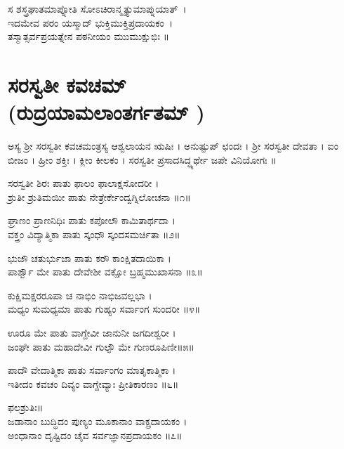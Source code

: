 ಸ ಶಸ್ತ್ರಘಾತಮಾಪ್ನೋತಿ ಸೋಽಚಿರಾನ್ಮೃತ್ಯುಮಾಪ್ನುಯಾತ್~।\\
ಇದಮೇವ ಪರಂ ಯಸ್ಮಾದ್ ಭುಕ್ತಿಮುಕ್ತಿಪ್ರದಾಯಕಂ~।\\
ತಸ್ಮಾತ್ಸರ್ವಪ್ರಯತ್ನೇನ ಪಠನೀಯಂ ಮುುಮುಕ್ಷುಭಿಃ ॥

\section{ಸರಸ್ವತೀ ಕವಚಮ್\\ (ರುದ್ರಯಾಮಲಾಂತರ್ಗತಮ್ )}

ಅಸ್ಯ ಶ್ರೀ ಸರಸ್ವತೀ ಕವಚಮಂತ್ರಸ್ಯ ಆಶ್ವಲಾಯನ ಋಷಿಃ । ಅನುಷ್ಟುಪ್ ಛಂದಃ । ಶ್ರೀ ಸರಸ್ವತೀ ದೇವತಾ । ಐಂ ಬೀಜಂ । ಹ್ರೀಂ ಶಕ್ತಿಃ । ಕ್ಲೀಂ ಕೀಲಕಂ । ಸರಸ್ವತೀ ಪ್ರಸಾದಸಿದ್ಧ್ಯರ್ಥೇ ಜಪೇ ವಿನಿಯೋಗಃ ॥


ಸರಸ್ವತೀ ಶಿರಃ ಪಾತು ಫಾಲಂ ಫಾಲಾಕ್ಷಸೋದರೀ ।\\
ಶ್ರುತೀ ಶ್ರುತಿಮಯೀ ಪಾತು ನೇತ್ರೇರ್ಕೇಂದ್ವಗ್ನಿಲೋಚನಾ ॥೧॥

ಘ್ರಾಣಂ ಪ್ರಾಣನಿಧಿಃ ಪಾತು ಕಪೋಲೌ ಕಾಮಿತಾರ್ಥದಾ ।\\
ವಕ್ತ್ರಂ ವಿದ್ಯಾತ್ಮಿಕಾ ಪಾತು ಸ್ಕಂಧೌ ಸ್ಕಂದಸಮರ್ಚಿತಾ ॥೨॥

ಭುಜೌ ಚತುರ್ಭುಜಾ ಪಾತು ಕರೌ ಕಾಂಕ್ಷಿತದಾಯಿಕಾ ।\\
ಪಾರ್ಶ್ವೌ ಮೇ ಪಾತು ದೇವೇಶೀ ವಕ್ಷೋ ಬ್ರಹ್ಮಮುಖಾಸನಾ ॥೩॥

ಕುಕ್ಷಿಮಕ್ಷರರೂಪಾ ಚ ನಾಭಿಂ ನಾಭಿಜವಲ್ಲಭಾ ।\\
ಮಧ್ಯಂ ಸುಮಧ್ಯಮಾ ಪಾತು ಗುಹ್ಯಂ ಸರ್ವಾಂಗ ಸುಂದರೀ ॥೪॥

ಊರೂ ಮೇ ಪಾತು ವಾಗ್ದೇವೀ ಜಾನುನೀ ಜಗದೀಶ್ವರೀ ।\\
ಜಂಘೇ ಪಾತು ಮಹಾದೇವೀ ಗುಲ್ಫೌ ಮೇ ಗುಣರೂಪಿಣೀ॥೫॥

ಪಾದೌ ವೇದಾತ್ಮಿಕಾ ಪಾತು ಸರ್ವಾಂಗಂ ಮಾತೃಕಾತ್ಮಿಕಾ ।\\
ಇತೀದಂ ಕವಚಂ ದಿವ್ಯಂ ವಾಗ್ದೇವ್ಯಾಃ ಪ್ರೀತಿಕಾರಣಂ ॥೬॥

ಫಲಶ್ರುತಿಃ॥\\
ಜಡಾನಾಂ ಬುದ್ಧಿದಂ ಪುಣ್ಯಂ ಮೂಕಾನಾಂ ವಾಕ್ಪ್ರದಾಯಕಂ ।\\
ಅಂಧಾನಾಂ ದೃಷ್ಟಿದಂ ಚೈವ ಸರ್ವಜ್ಞಾನಪ್ರದಾಯಕಂ ॥೭॥

